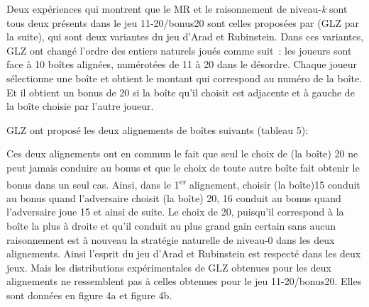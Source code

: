 \begin{Article}
\begin{refsection}[UmbhauerFR]
Deux expériences qui montrent que le MR et le raisonnement de
niveau-\emph{k} sont tous deux présents dans le jeu 11-20/bonus20 sont
celles proposées par \textcite{goeree2018} (GLZ par la suite), qui
sont deux variantes du jeu d'Arad et Rubinstein. Dans ces variantes, GLZ
ont changé l'ordre des entiers naturels joués comme suit~: les joueurs
sont face à 10 boîtes alignées, numérotées de 11 à 20 dans le désordre.
Chaque joueur sélectionne une boîte et obtient le montant qui correspond
au numéro de la boîte. Et il obtient un bonus de 20 si la boîte qu'il
choisit est adjacente et à gauche de la boîte choisie par l'autre
joueur.

GLZ ont proposé les deux alignements de boîtes suivants (tableau 5):

\begin{table}[h!]
\caption{Les deux alignements proposés par Goeree, Louis et Zang [2018]}
\label{tab5}
\centering
{}
\end{table}

Ces deux alignements ont en commun le fait que seul le choix de (la
boîte) 20 ne peut jamais conduire au bonus et que le choix de toute
autre boîte fait obtenir le bonus dans un seul cas. Ainsi, dans le
1\textsuperscript{er} alignement, choisir (la boîte)15 conduit au bonus
quand l'adversaire choisit (la boîte) 20, 16 conduit au bonus quand
l'adversaire joue 15 et ainsi de suite. Le choix de 20, puisqu'il
correspond à la boîte la plus à droite et qu'il conduit au plus grand
gain certain sans aucun raisonnement est à nouveau la stratégie
naturelle de niveau-0 dans les deux alignements. Ainsi l'esprit du jeu
d'Arad et Rubinstein est respecté dans les deux jeux. Mais les
distributions expérimentales de GLZ obtenues pour les deux alignements
ne ressemblent pas à celles obtenues pour le jeu 11-20/bonus20. Elles
sont données en figure 4a et figure 4b.


\end{refsection}
\end{Article}
